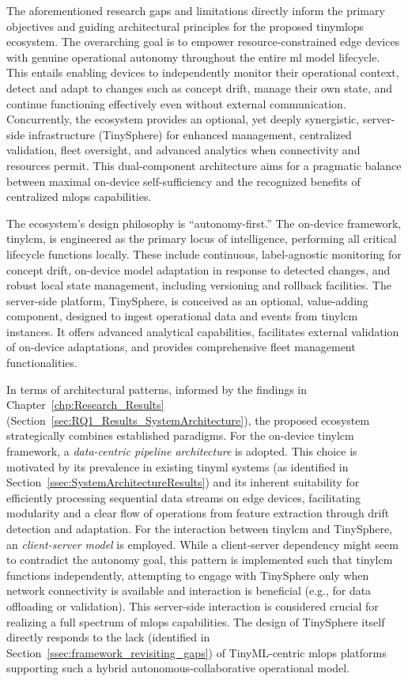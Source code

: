 The aforementioned research gaps and limitations directly inform the primary objectives and guiding architectural principles for the proposed \gls{tinymlops} ecosystem. The overarching goal is to empower resource-constrained edge devices with genuine operational autonomy throughout the entire \gls{ml} model lifecycle. This entails enabling devices to independently monitor their operational context, detect and adapt to changes such as concept drift, manage their own state, and continue functioning effectively even without external communication. Concurrently, the ecosystem provides an optional, yet deeply synergistic, server-side infrastructure (TinySphere) for enhanced management, centralized validation, fleet oversight, and advanced analytics when connectivity and resources permit. This dual-component architecture aims for a pragmatic balance between maximal on-device self-sufficiency and the recognized benefits of centralized \gls{mlops} capabilities.

The ecosystem's design philosophy is ``autonomy-first.'' The on-device framework, \gls{tinylcm}, is engineered as the primary locus of intelligence, performing all critical lifecycle functions locally. These include continuous, label-agnostic monitoring for concept drift, on-device model adaptation in response to detected changes, and robust local state management, including versioning and rollback facilities. The server-side platform, TinySphere, is conceived as an optional, value-adding component, designed to ingest operational data and events from \gls{tinylcm} instances. It offers advanced analytical capabilities, facilitates external validation of on-device adaptations, and provides comprehensive fleet management functionalities.

In terms of architectural patterns, informed by the findings in Chapter~\ref{chp:Research_Results} (Section~\ref{sec:RQ1_Results_SystemArchitecture}), the proposed ecosystem strategically combines established paradigms. For the on-device \gls{tinylcm} framework, a \textit{data-centric pipeline architecture} is adopted. This choice is motivated by its prevalence in existing \gls{tinyml} systems (as identified in Section~\ref{ssec:SystemArchitectureResults}) and its inherent suitability for efficiently processing sequential data streams on edge devices, facilitating modularity and a clear flow of operations from feature extraction through drift detection and adaptation. For the interaction between \gls{tinylcm} and TinySphere, an \textit{client-server model} is employed. While a client-server dependency might seem to contradict the autonomy goal, this pattern is implemented such that \gls{tinylcm} functions independently, attempting to engage with TinySphere only when network connectivity is available and interaction is beneficial (e.g., for data offloading or validation). This server-side interaction is considered crucial for realizing a full spectrum of \gls{mlops} capabilities. The design of TinySphere itself directly responds to the lack (identified in Section~\ref{ssec:framework_revisiting_gaps}) of TinyML-centric \gls{mlops} platforms supporting such a hybrid autonomous-collaborative operational model.

